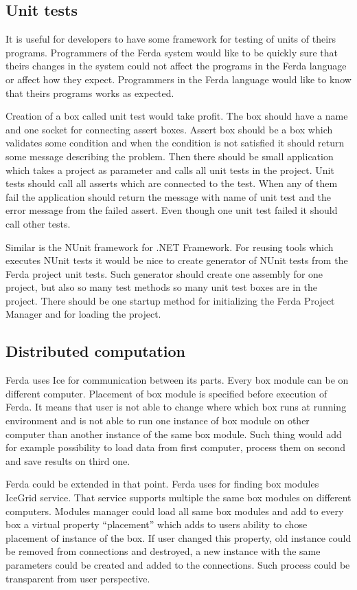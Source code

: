 \documentclass[a4paper,12pt]{book}
\begin{document}
\subsection{Unit tests}
It is useful for developers to have some framework for testing of units of theirs programs. Programmers of the Ferda system would like to be quickly sure that theirs changes in the system could not affect the programs in the Ferda language or affect how they expect. Programmers in the Ferda language would like to know that theirs programs works as expected.

Creation of a box called unit test would take profit. The box should have a name and one socket for connecting assert boxes. Assert box should be a box which validates some condition and when the condition is not satisfied it should return some message describing the problem. Then there should be small application which takes a project as parameter and calls all unit tests in the project. Unit tests should call all asserts which are connected to the test. When any of them fail the application should return the message with name of unit test and the error message from the failed assert. Even though one unit test failed it should call other tests.

Similar is the NUnit framework for .NET Framework. For reusing tools which executes NUnit tests it would be nice to create generator of NUnit tests from the Ferda project unit tests. Such generator should create one assembly for one project, but also so many test methods so many unit test boxes are in the project. There should be one startup method for initializing the Ferda Project Manager and for loading the project. 

\subsection{Distributed computation}
Ferda uses Ice for communication between its parts. Every box module can be on different computer. Placement of box module is specified before execution of Ferda. It means that user is not able to change where which box runs at running environment and is not able to run one instance of box module on other computer than another instance of the same box module. Such thing would add for example possibility to load data from first computer, process them on second and save results on third one. 

Ferda could be extended in that point. Ferda uses for finding box modules IceGrid service. That service supports multiple the same box modules on different computers. Modules manager could load all same box modules and add to every box a virtual property ``placement'' which adds to users ability to chose placement of instance of the box. If user changed this property, old instance could be removed from connections and destroyed, a new instance with the same parameters could be created and added to the connections. Such process could be transparent from user perspective.
\end{document}
